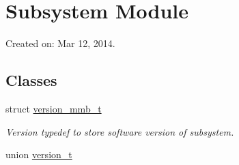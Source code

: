 \hypertarget{group__subsys}{\section{Subsystem Module}
\label{group__subsys}
}


Created on\+: Mar 12, 2014.  


\subsection*{Classes}
\begin{DoxyCompactItemize}
\item 
struct \hyperlink{structversion__mmb__t}{version\+\_\+mmb\+\_\+t}
\begin{DoxyCompactList}\small\item\em Version typedef to store software version of subsystem. \end{DoxyCompactList}\item 
union \hyperlink{unionversion__t}{version\+\_\+t}
\end{DoxyCompactItemize}
